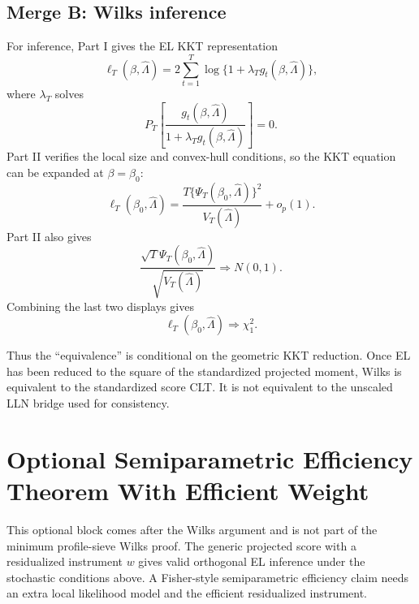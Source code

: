 \documentclass[12pt]{article}
\numberwithin{equation}{section}
\theoremstyle{definition}
\newcommand{\op}{o_p}
\begin{document}
\subsection{Merge B: Wilks inference}

For inference, Part I gives the EL KKT representation
\[
    \ell_T(\beta,\widehat\Lambda)
    =2\sum_{t=1}^T\log\{1+\lambda_Tg_t(\beta,\widehat\Lambda)\},
\]
where \(\lambda_T\) solves
\[
    P_T\left[\frac{g_t(\beta,\widehat\Lambda)}
    {1+\lambda_Tg_t(\beta,\widehat\Lambda)}\right]=0.
\]
Part II verifies the local size and convex-hull conditions, so the KKT equation
can be expanded at \(\beta=\beta_0\):
\[
    \ell_T(\beta_0,\widehat\Lambda)
    =\frac{T\{\Psi_T(\beta_0,\widehat\Lambda)\}^2}
           {V_T(\widehat\Lambda)}+\op(1).
\]
Part II also gives
\[
    \frac{\sqrt T\Psi_T(\beta_0,\widehat\Lambda)}
         {\sqrt{V_T(\widehat\Lambda)}}
    \Rightarrow N(0,1).
\]
Combining the last two displays gives
\begin{equation}
    \ell_T(\beta_0,\widehat\Lambda)
    \Rightarrow \chi_1^2.
    \label{eq:target-wilks}
\end{equation}

Thus the ``equivalence'' is conditional on the geometric KKT reduction. Once
EL has been reduced to the square of the standardized projected moment, Wilks is
equivalent to the standardized score CLT. It is not equivalent to the unscaled
LLN bridge used for consistency.

\begin{center}
\end{center}

\section{Optional Semiparametric Efficiency Theorem With Efficient Weight}

This optional block comes after the Wilks argument and is not part of the
minimum profile-sieve Wilks proof. The generic projected score with a residualized
instrument \(w\) gives valid orthogonal EL inference under the stochastic
conditions above. A Fisher-style semiparametric efficiency claim needs an extra
local likelihood model and the efficient residualized instrument.
\end{document}
